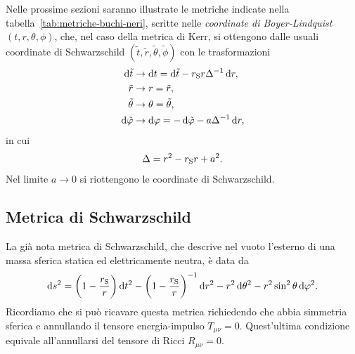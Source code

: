 Nelle prossime sezioni saranno illustrate le metriche indicate nella
tabella~\ref{tab:metriche-buchi-neri}, scritte nelle \emph{coordinate di
  Boyer-Lindquist} \((t, r, \theta,
\phi)\), che, nel caso della metrica di Kerr, si ottengono dalle usuali
coordinate di Schwarzschild \((\tilde{t}, \tilde{r}, \tilde{\theta},
\tilde{\phi})\) con le
trasformazioni~\parencites{1967JMP.....8..265B}{2007arXiv0706.0622V}
\begin{subequations}
  \begin{align}
    \dd\tilde{t}    & \to \dd t   = \dd\tilde{t} - r_{\textup{S}}r\Delta^{-1}
                      \dd r, \\
    \tilde{r}       & \to r       = \tilde{r},                           \\
    \tilde{\theta}  & \to \theta  = \tilde{\theta},                      \\
    \dd\tilde{\phi} & \to \dd\phi = -\dd\tilde{\phi} - a\Delta^{-1} \dd r,
  \end{align}
\end{subequations}
in cui
\begin{equation}
  \Delta = r^{2} - r_{\textup{S}}r + a^{2}.
\end{equation}
Nel limite \(a\to 0\) si riottengono le coordinate di Schwarzschild.

\subsection{Metrica di Schwarzschild}
\label{sec:metrica-schwarzschild-bh}

La già nota metrica di Schwarzschild, che descrive nel vuoto l'esterno di una
massa sferica statica ed elettricamente neutra, è data da
\begin{equation}
  \label{eq:metrica-schwarzschild-bh}
  \mathop{}\!\mathrm{d} s^{2} = \bigg(1 - \frac{r_{\textup{S}}}{r} \bigg) \mathop{}\!\mathrm{d} t^{2} - \bigg(1 -
  \frac{r_{\textup{S}}}{r}\bigg)^{-1}\mathop{}\!\mathrm{d} r^{2} - r^{2}\mathop{}\!\mathrm{d}\theta^{2} -
  r^{2}\sin^{2}\theta \mathop{}\!\mathrm{d}\varphi^{2}.
\end{equation}
Ricordiamo che si può ricavare questa metrica richiedendo che abbia simmetria
sferica e annullando il tensore energia-impulso \(T_{\mu\nu} = 0\).
Quest'ultima condizione equivale all'annullarsi del tensore di Ricci
\(R_{\mu\nu} = 0\).

